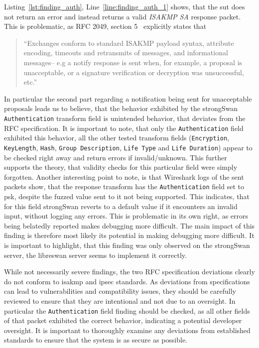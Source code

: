 Listing~\ref{lst:finding_auth}, Line~\ref{line:finding_auth_1} shows, that the \ac{sut} does not return an error and instead returns a valid \emph{ISAKMP SA} response packet. This is problematic, as RFC 2049, section 5~\cite{rfc:ikev1} explicitly states that 

\begin{quotation}
	``Exchanges conform to standard ISAKMP payload syntax, attribute
	encoding, timeouts and retransmits of messages, and informational
	messages-- e.g a notify response is sent when, for example, a
	proposal is unacceptable, or a signature verification or decryption
	was unsuccessful, etc.''
\end{quotation}

In particular the second part regarding a notification being sent for unacceptable proposals leads us to believe, that the behavior exhibited by the strongSwan \texttt{Authentication} transform field is unintended behavior, that deviates from the RFC specification. It is important to note, that only the \texttt{Authentication} field exhibited this behavior, all the other tested transform fields (\texttt{Encryption}, \texttt{KeyLength}, \texttt{Hash}, \texttt{Group Description}, \texttt{Life Type} and \texttt{Life Duration}) appear to be checked right away and return errors if invalid/unknown. This further supports the theory, that validity checks for this particular field were simply forgotten. Another interesting point to note, is that Wireshark logs of the sent packets show, that the response transform has the \texttt{Authentication} field set to \ac{psk}, despite the fuzzed value sent to it not being supported. This indicates, that for this field strongSwan reverts to a default value if it encounters an invalid input, without logging any errors. This is problematic in its own right, as errors being belatedly reported makes debugging more difficult. The main impact of this finding is therefore most likely its potential in making debugging more difficult. It is important to highlight, that this finding was only observed on the strongSwan server, the libreswan server seems to implement it correctly.

While not necessarily severe findings, the two RFC specification deviations clearly do not conform to \ac{isakmp} and \ac{ipsec} standards. As deviations from specifications can lead to vulnerabilities and compatibility issues, they should be carefully reviewed to ensure that they are intentional and not due to an oversight. In particular the \texttt{Authentication} field finding should be checked, as all other fields of that packet exhibited the correct behavior, indicating a potential developer oversight. It is important to thoroughly examine any deviations from established standards to ensure that the system is as secure as possible.

